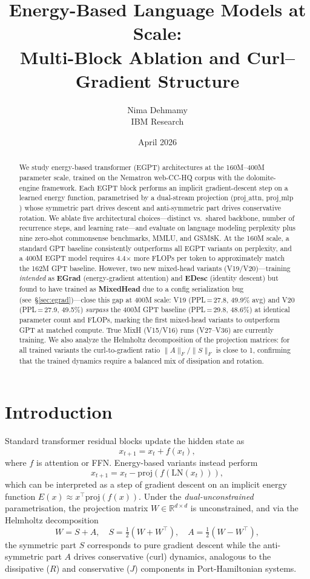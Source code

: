 \documentclass[11pt,a4paper]{article}
\title{\textbf{Energy-Based Language Models at Scale: \\
Multi-Block Ablation and Curl--Gradient Structure}}
\author{Nima Dehmamy \\ IBM Research}
\date{April 2026}
\begin{document}
\maketitle

\begin{abstract}
We study energy-based transformer (EGPT) architectures at the 160M--400M parameter scale,
trained on the Nematron web-CC-HQ corpus with the dolomite-engine framework.
Each EGPT block performs an implicit gradient-descent step on a learned energy function,
parametrised by a dual-stream projection ($\mathrm{proj\_attn}$, $\mathrm{proj\_mlp}$) whose
symmetric part drives descent and anti-symmetric part drives conservative rotation.
We ablate five architectural choices---distinct vs.\ shared backbone, number of recurrence
steps, and learning rate---and evaluate on language modeling perplexity plus nine zero-shot
commonsense benchmarks, MMLU, and GSM8K.
At the 160M scale, a standard GPT baseline consistently outperforms all EGPT variants on
perplexity, and a 400M EGPT model requires 4.4$\times$ more FLOPs per token to
approximately match the 162M GPT baseline.
However, two new mixed-head variants (V19/V20)---training \emph{intended} as
\textbf{EGrad} (energy-gradient attention) and \textbf{EDesc} (identity descent)
but found to have trained as \textbf{MixedHead} due to a config serialization bug
(see~\S\ref{sec:egrad})---close this gap at 400M scale:
V19 (PPL\,=\,27.8, 49.9\% avg) and V20 (PPL\,=\,27.9, 49.5\%) \emph{surpass}
the 400M GPT baseline (PPL\,=\,29.8, 48.6\%) at identical parameter count and FLOPs,
marking the first mixed-head variants to outperform GPT at matched compute.
True MixH (V15/V16) runs (V27--V36) are currently training.
We also analyze the Helmholtz decomposition of the projection matrices:
for all trained variants the curl-to-gradient ratio $\|A\|_F / \|S\|_F$ is close to 1,
confirming that the trained dynamics require a balanced mix of dissipation and rotation.
\end{abstract}

\section{Introduction}

Standard transformer residual blocks update the hidden state as
\[
  x_{t+1} = x_t + f(x_t),
\]
where $f$ is attention or FFN.  Energy-based variants instead perform
\[
  x_{t+1} = x_t - \mathrm{proj}(f(\mathrm{LN}(x_t))),
\]
which can be interpreted as a step of gradient descent on an implicit energy function
$E(x) \approx x^\top \mathrm{proj}(f(x))$.
Under the \emph{dual-unconstrained} parametrisation, the projection matrix
$W \in \mathbb{R}^{d \times d}$ is unconstrained, and via the Helmholtz decomposition
\[
  W = S + A, \quad S = \tfrac{1}{2}(W + W^\top), \quad A = \tfrac{1}{2}(W - W^\top),
\]
the symmetric part $S$ corresponds to pure gradient descent while the anti-symmetric part $A$
drives conservative (curl) dynamics, analogous to the dissipative ($R$) and conservative ($J$)
components in Port-Hamiltonian systems.
\end{document}
